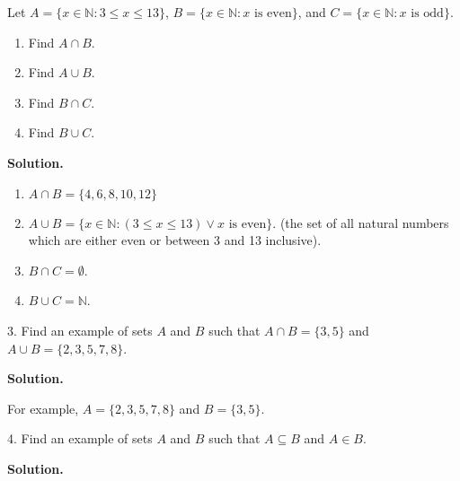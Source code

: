 \documentclass[10pt,]{book}
\theoremstyle{plain}
\theoremstyle{definition}
\theoremstyle{definition}
\theoremstyle{definition}
\numberwithin{equation}{section}
\def\N{\mathbb N}
\def\st{:}
\begin{document}
\begin{exerciselist}
            Let \(A = \{x \in \N \st 3 \le x \le 13\}\), \(B = \{x \in \N \st x \mbox{ is even} \}\), and \(C = \{x \in \N \st x \mbox{ is odd} \}\).
\leavevmode%
\begin{enumerate}[label=(\alph*)]
\item\hypertarget{li-242}{}
                Find \(A \cap B\).
\item\hypertarget{li-243}{}
                Find \(A \cup B\).
\item\hypertarget{li-244}{}
                Find \(B \cap C\).
\item\hypertarget{li-245}{}
                Find \(B \cup C\).
\end{enumerate}
\par\smallskip
\par\smallskip
\noindent\textbf{Solution.}\hypertarget{solution-24}{}\quad
\leavevmode%
\begin{enumerate}[label=(\alph*)]
\item\hypertarget{li-246}{}\(A \cap B = \{4,6,8,10,12\}\)\item\hypertarget{li-247}{}\(A \cup B = \{x \in \N \st (3 \le x \le 13) \vee x \mbox{ is even} \}.\) (the set of all natural numbers which are either even or between 3 and 13 inclusive).\item\hypertarget{li-248}{}\(B \cap C = \emptyset\).\item\hypertarget{li-249}{}\(B \cup C = \N\).\end{enumerate}
\item[3.]\hypertarget{exercise-13}{}
            Find an example of sets \(A\) and \(B\) such that \(A\cap B = \{3, 5\}\) and \(A \cup B = \{2, 3, 5, 7, 8\}\).
\par\smallskip
\par\smallskip
\noindent\textbf{Solution.}\hypertarget{solution-25}{}\quad

            For example, \(A = \{2,3,5,7,8\}\) and \(B = \{3,5\}\).
\item[4.]\hypertarget{exercise-14}{}
            Find an example of sets \(A\) and \(B\) such that \(A \subseteq B\) and \(A \in B\).
\par\smallskip
\par\smallskip
\noindent\textbf{Solution.}\hypertarget{solution-26}{}\quad


\end{exerciselist}
\end{document}
